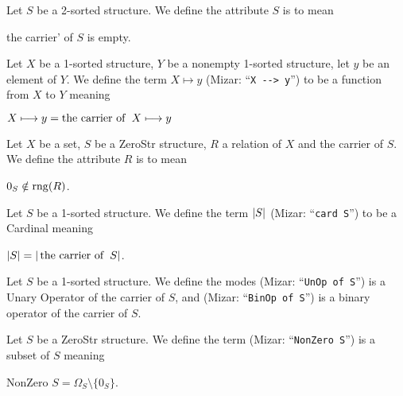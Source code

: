 \documentclass{article}
\begin{document}
\begin{definition}
Let $S$ be a 2-sorted structure.
We define the attribute $S$ is  to mean
\begin{defn}
\item the carrier' of $S$ is empty.
\end{defn}
\end{definition}

\begin{definition}
Let $X$ be a 1-sorted structure, $Y$ be a nonempty 1-sorted structure,
let $y$ be an element of $Y$.
We define the term $X\longmapsto y$ (Mizar: ``\verb#X --> y#'') to be a function from $X$ to $Y$ meaning
\begin{defn}
\item $X\longmapsto y=\operatorname{the\ carrier\ of\ }X\longmapsto y$
\end{defn}
\end{definition}

\begin{definition}
Let $X$ be a set, $S$ be a ZeroStr structure, $R$ a relation of $X$ and
the carrier of $S$.
We define the attribute $R$ is  to mean
\begin{defn}
\item $0_{S}\notin\operatorname{rng}(R)$.
\end{defn}
\end{definition}

\begin{definition}
Let $S$ be a 1-sorted structure.
We define the term $|S|$ (Mizar: ``\verb#card S#'') to be a
Cardinal meaning
\begin{defn}
\item $|S|=|\operatorname{the\ carrier\ of\ }S|$.
\end{defn}
\end{definition}

\begin{definition}
Let $S$ be a 1-sorted structure.
We define the modes  (Mizar:
``\verb#UnOp of S#'') is a Unary Operator of the carrier of $S$, and
 (Mizar: ``\verb#BinOp of S#'') is a
binary operator of the carrier of $S$.
\end{definition}

\begin{definition}
Let $S$ be a ZeroStr structure.
We define the term  (Mizar: ``\verb#NonZero S#'')
is a subset of $S$ meaning
\begin{defn}
\item NonZero $S = \Omega_{S}\setminus\{0_{S}\}$.
\end{defn}
\end{definition}
\end{document}
